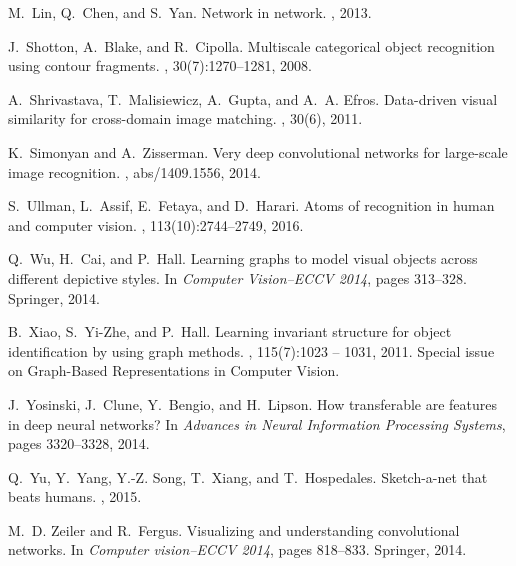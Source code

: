 \documentclass[preprint]{sig-alternate-05-2015}
\begin{document}
\begin{thebibliography}{10}
M.~Lin, Q.~Chen, and S.~Yan.
\newblock Network in network.
, 2013.

J.~Shotton, A.~Blake, and R.~Cipolla.
\newblock Multiscale categorical object recognition using contour fragments.
, 30(7):1270--1281, 2008.

A.~Shrivastava, T.~Malisiewicz, A.~Gupta, and A.~A. Efros.
\newblock Data-driven visual similarity for cross-domain image matching.
, 30(6), 2011.

K.~Simonyan and A.~Zisserman.
\newblock Very deep convolutional networks for large-scale image recognition.
, abs/1409.1556, 2014.

S.~Ullman, L.~Assif, E.~Fetaya, and D.~Harari.
\newblock Atoms of recognition in human and computer vision.
,
  113(10):2744--2749, 2016.

Q.~Wu, H.~Cai, and P.~Hall.
\newblock Learning graphs to model visual objects across different depictive
  styles.
\newblock In {\em Computer Vision--ECCV 2014}, pages 313--328. Springer, 2014.

B.~Xiao, S.~Yi-Zhe, and P.~Hall.
\newblock Learning invariant structure for object identification by using graph
  methods.
, 115(7):1023 -- 1031,
  2011.
\newblock Special issue on Graph-Based Representations in Computer Vision.

J.~Yosinski, J.~Clune, Y.~Bengio, and H.~Lipson.
\newblock How transferable are features in deep neural networks?
\newblock In {\em Advances in Neural Information Processing Systems}, pages
  3320--3328, 2014.

Q.~Yu, Y.~Yang, Y.-Z. Song, T.~Xiang, and T.~Hospedales.
\newblock Sketch-a-net that beats humans.
, 2015.

M.~D. Zeiler and R.~Fergus.
\newblock Visualizing and understanding convolutional networks.
\newblock In {\em Computer vision--ECCV 2014}, pages 818--833. Springer, 2014.

\end{thebibliography}
\balancecolumns
\end{document}
